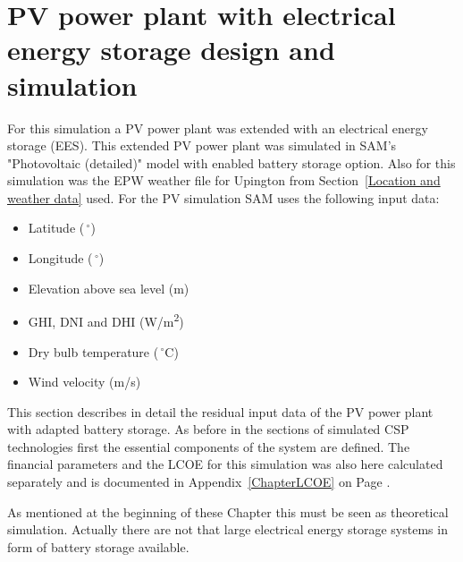 \section{PV power plant with electrical energy storage design and simulation} \label{section PV system}
For this simulation a PV power plant was extended with an electrical energy storage (EES). This extended PV power plant was simulated in SAM's "Photovoltaic (detailed)" model with enabled battery storage option. Also for this simulation was the EPW weather file for Upington from Section~\ref{Location and weather data} used. For the PV simulation SAM uses the following input data:
\begin{itemize}
\item Latitude ($\,^{\circ}$)
\item Longitude ($\,^{\circ}$)
\item Elevation above sea level (m)
\item GHI, DNI and DHI (W/m\textsuperscript{2})
\item Dry bulb temperature ($\,^{\circ}\mathrm{C}$)
\item Wind velocity (m/s)
\end{itemize}
This section describes in detail the residual input data of the PV power plant with adapted battery storage. As before in the sections of simulated CSP technologies first the essential components of the system are defined. The financial parameters and the LCOE for this simulation was also here calculated separately and is documented in Appendix~\ref{ChapterLCOE} on Page \pageref{ChapterLCOE}.



As mentioned at the beginning of these Chapter this must be seen as theoretical simulation. Actually there are not that large electrical energy storage systems in form of battery storage available.



